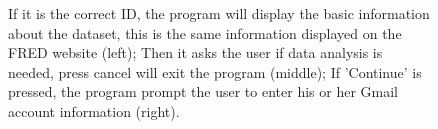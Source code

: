 \documentclass[12pt]{article}
\begin{document}
\begin{figure}[htb]
\caption{If it is the correct ID, the program will display the basic information about the dataset, this is the same information displayed on the FRED website (left);
Then it asks the user if data analysis is needed, press cancel will exit the program (middle);
If 'Continue' is pressed, the program prompt the user to enter his or her Gmail account information (right).}

\label{fig:data_info}
\end{figure}
\end{document}
